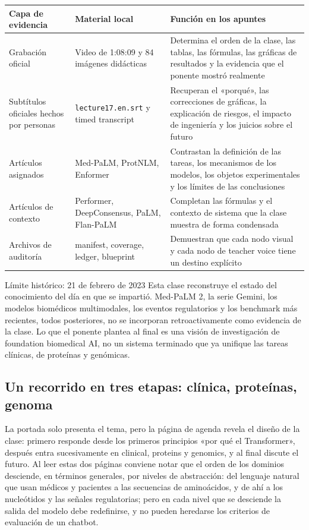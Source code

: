\begin{longtable}{@{}L{0.18\textwidth}L{0.28\textwidth}L{0.42\textwidth}@{}}
\toprule
Capa de evidencia & Material local & Función en los apuntes \\
\midrule
Grabación oficial & Video de 1:08:09 y 84 imágenes didácticas & Determina el orden de la clase, las tablas, las fórmulas, las gráficas de resultados y la evidencia que el ponente mostró realmente \\
Subtítulos oficiales hechos por personas & \texttt{lecture17.en.srt} y timed transcript & Recuperan el «porqué», las correcciones de gráficas, la explicación de riesgos, el impacto de ingeniería y los juicios sobre el futuro \\
Artículos asignados & Med-PaLM, ProtNLM, Enformer & Contrastan la definición de las tareas, los mecanismos de los modelos, los objetos experimentales y los límites de las conclusiones \\
Artículos de contexto & Performer, DeepConsensus, PaLM, Flan-PaLM & Completan las fórmulas y el contexto de sistema que la clase muestra de forma condensada \\
Archivos de auditoría & manifest, coverage, ledger, blueprint & Demuestran que cada nodo visual y cada nodo de teacher voice tiene un destino explícito \\
\bottomrule
\end{longtable}

\begin{warningbox}{Límite histórico: 21 de febrero de 2023}
Esta clase reconstruye el estado del conocimiento del día en que se impartió. Med-PaLM 2, la serie Gemini, los modelos biomédicos multimodales, los eventos regulatorios y los benchmark más recientes, todos posteriores, no se incorporan retroactivamente como evidencia de la clase. Lo que el ponente plantea al final es una visión de investigación de foundation biomedical AI, no un sistema terminado que ya unifique las tareas clínicas, de proteínas y genómicas.
\end{warningbox}

\subsection{Un recorrido en tres etapas: clínica, proteínas, genoma}

La portada solo presenta el tema, pero la página de agenda revela el diseño de la clase: primero responde desde los primeros principios «por qué el Transformer», después entra sucesivamente en clinical, proteins y genomics, y al final discute el futuro. Al leer estas dos páginas conviene notar que el orden de los dominios desciende, en términos generales, por niveles de abstracción: del lenguaje natural que usan médicos y pacientes a las secuencias de aminoácidos, y de ahí a los nucleótidos y las señales regulatorias; pero en cada nivel que se desciende la salida del modelo debe redefinirse, y no pueden heredarse los criterios de evaluación de un chatbot.

